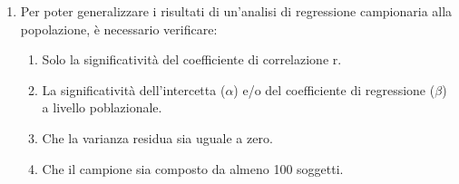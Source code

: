 \documentclass[12pt, a4paper]{article}
\begin{document}
\begin{enumerate}[resume]
    \item Per poter generalizzare i risultati di un'analisi di regressione campionaria alla popolazione, è necessario verificare:
    \begin{enumerate}
        \item Solo la significatività del coefficiente di correlazione r.
        \item La significatività dell'intercetta ($\alpha$) e/o del coefficiente di regressione ($\beta$) a livello poblazionale.
        \item Che la varianza residua sia uguale a zero.
        \item Che il campione sia composto da almeno 100 soggetti.
    \end{enumerate}
    \vspace{0.3cm}
\end{enumerate}

\end{document}
